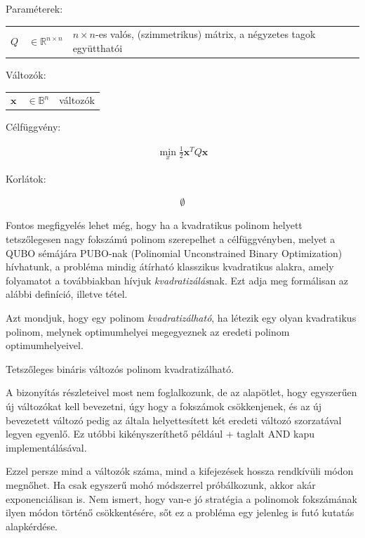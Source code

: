 Paraméterek:

\begin{tabular}{lll}
	$Q$ & $\in \mathbb{R}^{n×n}$  & $n × n$-es valós, (szimmetrikus) mátrix, a négyzetes tagok együtthatói \\
\end{tabular}

Változók:

\begin{tabular}{lll}
	$\mathbf{x}$ & $\in \mathbb{B}^n$ & változók \\
\end{tabular}

Célfüggvény:

\begin{align}
	\min_{x} \frac{1}{2} \mathbf{x}^T Q \mathbf{x}
\end{align}

Korlátok:

\begin{align}
	\emptyset
\end{align}

Fontos megfigyelés lehet még, hogy ha a kvadratikus polinom helyett tetszőlegesen nagy fokszámú polinom szerepelhet a célfüggvényben, melyet a QUBO sémájára PUBO-nak (Polinomial Unconstrained Binary Optimization) hívhatunk, a probléma mindig átírható klasszikus kvadratikus alakra, amely folyamatot a továbbiakban hívjuk \textit{kvadratizálás}nak. Ezt adja meg formálisan az alábbi definíció, illetve tétel.

\begin{definition}[Kvadratizálhatóság]\label{def:kvadratizalhato}
	Azt mondjuk, hogy egy polinom \textit{kvadratizálható}, ha létezik egy olyan kvadratikus polinom, melynek optimumhelyei megegyeznek az eredeti polinom optimumhelyeivel.
\end{definition}

\begin{allitas}\label{theorem:kvadratizalhato}
	Tetszőleges bináris változós polinom kvadratizálható.
	
	A bizonyítás részleteivel most nem foglalkozunk, de az alapötlet, hogy egyszerűen új változókat kell bevezetni, úgy hogy a fokszámok csökkenjenek, és az új bevezetett változó pedig az általa helyettesített két eredeti változó szorzatával legyen egyenlő. Ez utóbbi kikényszeríthető például \az+ taglalt AND kapu implementálásával.
\end{allitas}
	 
Ezzel persze mind a változók száma, mind a kifejezések hossza rendkívüli módon megnőhet. Ha csak egyszerű mohó módszerrel próbálkozunk, akkor akár exponenciálisan is. Nem ismert, hogy van-e jó stratégia a polinomok fokszámának ilyen módon történő csökkentésére, sőt ez a probléma egy jelenleg is futó kutatás alapkérdése.


